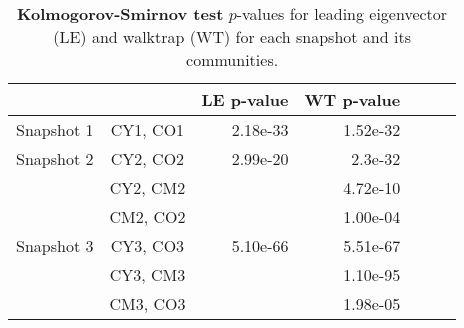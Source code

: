 \begin{table}
\small
\centering
\caption[Kolmogorov-Smirnov test]{\textbf{Kolmogorov-Smirnov test} $p$-values for leading eigenvector (LE) and walktrap (WT) for each snapshot and its communities.}
\label{tab:pvalues2}
\vspace*{5mm}
\begin{tabular}{lcrrrrr}
	\toprule

	 & & LE p-value & WT p-value\\
	\midrule 
	\quad Snapshot 1     & CY1, CO1 & 2.18e-33 & 1.52e-32 \\
	\midrule   							
	\quad Snapshot 2     & CY2, CO2 & 2.99e-20 & 2.3e-32 \\
					    & CY2, CM2 &          & 4.72e-10\\
					    & CM2, CO2 &          & 1.00e-04\\
	\midrule  
	\quad Snapshot 3     & CY3, CO3 & 5.10e-66 & 5.51e-67\\
					    & CY3, CM3 &          & 1.10e-95\\
						& CM3, CO3 &          & 1.98e-05\\ 
	\bottomrule
\end{tabular}
\end{table}